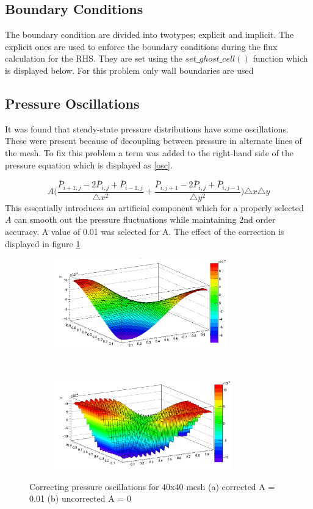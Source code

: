 \documentclass[paper=a4, fontsize=11pt, abstract=on]{scrartcl}
\numberwithin{equation}{section}		%
\numberwithin{figure}{section}			%
\numberwithin{table}{section}				%
\begin{document}
\subsection{Boundary Conditions}
The boundary condition are divided into twotypes; explicit and implicit. The explicit ones are used to enforce the boundary conditions during the flux calculation for the RHS. They are set using the $set\_ghost\_cell()$ function which is displayed below. For this problem only wall boundaries are used
\subsection{Pressure Oscillations}
It was found that steady-state pressure distributions have
some oscillations. These were present because of decoupling between pressure in alternate lines of the mesh. To fix this problem a term was added to the
right-hand side of the pressure equation which is displayed as \ref{osc}. 

 \begin{equation}
\label{osc}
A\Bigg(\frac{\overline{P}_{i+1,j}-2\overline{P}_{i,j}+\overline{P}_{i-1,j} }{\triangle x^2} +\frac{\overline{P}_{i,j+1}-2\overline{P}_{i,j}+\overline{P}_{i,j-1} }{\triangle y^2}\Bigg)\triangle x \triangle y
\end{equation} 
This essentially introduces an artificial component which for a properly selected $A$ can smooth out the pressure fluctuations while maintaining 2nd order accuracy.
A value of 0.01 was selected for A. The effect of the correction is displayed in figure \ref{osc2} 

\begin{figure}[H]
        \centering
        \begin{subfigure}[h]{0.5\textwidth}
                \includegraphics[width = 7.5cm]{o1}
                \caption{}
				
        \end{subfigure}%
       ~~~~~
        \begin{subfigure}[h]{0.5\textwidth}
                \includegraphics[width = 7.7cm]{o2}
                \caption{}
                
        \end{subfigure}
        \caption{Correcting pressure oscillations for 40x40 mesh (a) corrected A = 0.01 (b) uncorrected A = 0  }
        \label{osc2}
\end{figure}
\end{document}
